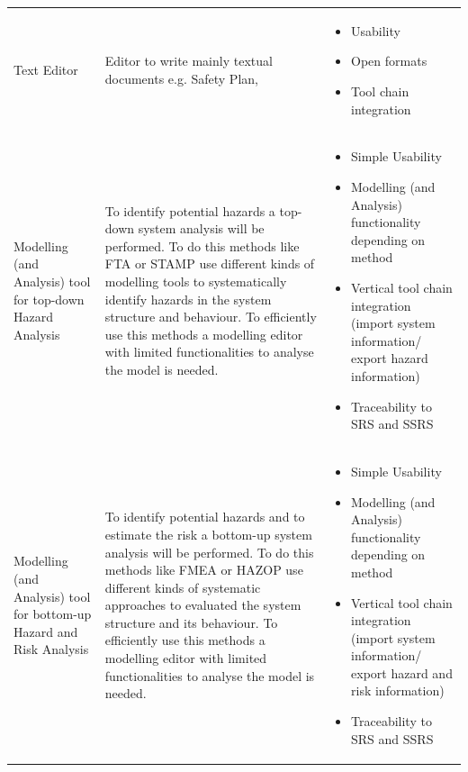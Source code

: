 \documentclass{template/openetcs_article}
\begin{document}
\begin{longtable}[htbp]{p{4cm}|p{5cm}|p{5cm}}
    Text Editor & Editor to write mainly textual documents e.g. Safety Plan,  & \begin{itemize}
    \item Usability
    \item Open formats
    \item Tool chain integration
        \end{itemize}
     \\ 
     Modelling (and Analysis) tool for top-down Hazard Analysis & To identify potential hazards a top-down system analysis will be performed. To do this methods like FTA or STAMP use different kinds of modelling tools to systematically identify hazards in the system structure and behaviour. To efficiently use this methods a modelling editor with limited functionalities to analyse the model is needed.  & \begin{itemize}
         \item Simple Usability
         \item Modelling (and Analysis) functionality depending on method
         \item Vertical tool chain integration (import system information/ export hazard information)
         \item Traceability to SRS and SSRS
             \end{itemize} \\ 
     Modelling (and Analysis) tool for bottom-up Hazard and Risk Analysis & To identify potential hazards and to estimate the risk a bottom-up system analysis will be performed. To do this methods like FMEA or HAZOP use different kinds of systematic approaches to evaluated the system structure and its behaviour. To efficiently use this methods a modelling editor with limited functionalities to analyse the model is needed.  & \begin{itemize}
              \item Simple Usability
              \item Modelling (and Analysis) functionality depending on method
              \item Vertical tool chain integration (import system information/ export hazard and risk information)
              \item Traceability to SRS and SSRS
                  \end{itemize} \\ 
                  

\end{longtable}
\end{document}
